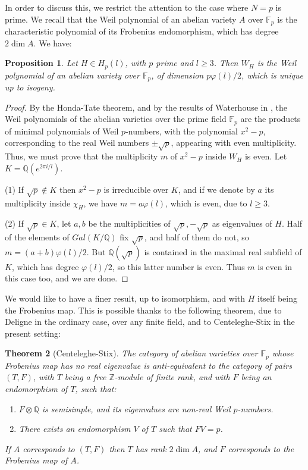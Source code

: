 \documentclass[11pt]{amsart}
\newtheorem{theorem}{Theorem}[section]
\newtheorem{proposition}[theorem]{Proposition}
\theoremstyle{definition}
\begin{document}
\medskip

In order to discuss this, we restrict the attention to the case where $N=p$ is prime. We recall that the Weil polynomial of an abelian variety $A$ over $\mathbb F_p$ is the characteristic polynomial of its Frobenius endomorphism, which has degree $2\dim A$. We have:

\begin{proposition}\label{pisog}
Let $H\in H_p(l)$, with $p$ prime and $l\geq3$. Then $W_H$ is the Weil polynomial of an abelian variety over $\mathbb F_p$, of dimension $p\varphi(l)/2$, which is unique up to isogeny.
\end{proposition}

\begin{proof}
By the Honda-Tate theorem, and by the results of Waterhouse in \cite{wat}, the Weil polynomials of the abelian varieties over the prime field $\mathbb F_p$ are the products of minimal polynomials of Weil $p$-numbers, with the polynomial $x^2-p$, corresponding to the real Weil numbers $\pm\sqrt{p}$, appearing with even multiplicity. Thus, we must prove that the multiplicity $m$ of $x^2-p$ inside $W_H$ is even. Let $K=\mathbb Q(e^{2\pi i/l})$.

\medskip

(1) If $\sqrt{p}\notin K$ then $x^2-p$ is irreducible over $K$, and if we denote by $a$ its multiplicity inside $\chi_H$, we have $m=a\varphi(l)$, which is even, due to $l\geq3$.

\medskip

(2) If $\sqrt{p}\in K$, let $a,b$ be the multiplicities of $\sqrt{p},-\sqrt{p}$ as eigenvalues of $H$. Half of the elements of $Gal(K/\mathbb Q)$ fix $\sqrt{p}$, and half of them do not, so $m=(a+b)\varphi(l)/2$. But $\mathbb Q(\sqrt{p})$ is contained in the maximal real subfield of $K$, which has degree $\varphi(l)/2$, so this latter number is even. Thus $m$ is even in this case too, and we are done.
\end{proof}

We would like to have a finer result, up to isomorphism, and with $H$ itself being the Frobenius map. This is possible thanks to the following theorem, due to Deligne \cite{del} in the ordinary case, over any finite field, and to Centeleghe-Stix \cite{cst} in the present setting:

\begin{theorem}[Centeleghe-Stix]\label{tcs}
The category of abelian varieties over $\mathbb F_p$ whose Frobenius map has no real eigenvalue is anti-equivalent to the category of pairs $(T,F)$, with $T$ being a free $\mathbb Z$-module of finite rank, and with $F$ being an endomorphism of $T$, such that:
\begin{enumerate}
\item $F\otimes\mathbb Q$ is semisimple, and its eigenvalues are non-real Weil $p$-numbers.

\item There exists an endomorphism $V$ of $T$ such that $FV=p$.
\end{enumerate}
If $A$ corresponds to $(T,F)$ then $T$ has rank $2\dim A$, and $F$ corresponds to the Frobenius map of $A$.
\end{theorem}
\end{document}
